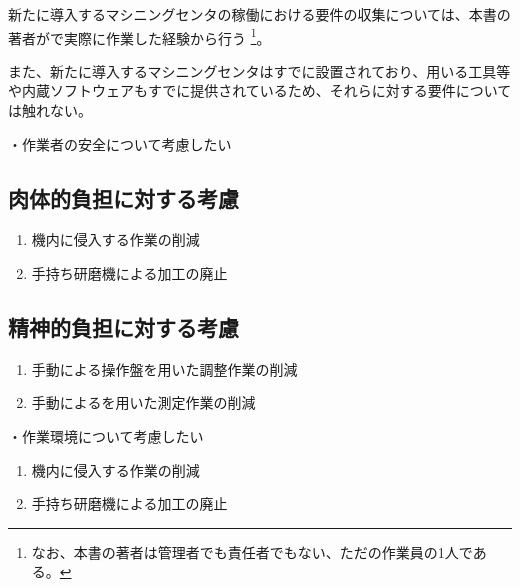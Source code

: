 

新たに導入するマシニングセンタの稼働における要件の収集については、本書の著者が\MMC で実際に作業した経験から行う
\footnote{なお、本書の著者は管理者でも責任者でもない、ただの作業員の1人である。}。

また、新たに導入するマシニングセンタはすでに設置されており、用いる工具等や内蔵ソフトウェアもすでに提供されているため、それらに対する要件については触れない。



・作業者の安全について考慮したい


\subsection{肉体的負担に対する考慮}
\begin{enumerate}[label=\sarrow]
\item 機内に侵入する作業の削減
\item 手持ち研磨機による加工の廃止
\end{enumerate}


\subsection{精神的負担に対する考慮}
\begin{enumerate}[label=\sarrow]
\item 手動による操作盤を用いた調整作業の削減
\item 手動による\TouchSensorProbe を用いた測定作業の削減
\end{enumerate}



・作業環境について考慮したい
\begin{enumerate}[label=\sarrow]
\item 機内に侵入する作業の削減
\item 手持ち研磨機による加工の廃止
\end{enumerate}



